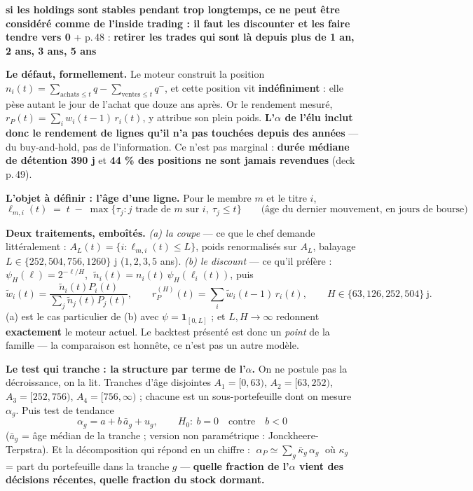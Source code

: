 \documentclass[11pt,a4paper]{article}
\newcommand{\remarque}[1]{{\color{rouge}\textbf{\og{} #1 \fg{}}}}
\begin{document}
\remarque{si les holdings sont stables pendant trop longtemps, ce ne peut être considéré comme de l'inside trading : il faut les discounter et les faire tendre vers 0}
\;+\; p.\,48 : \remarque{retirer les trades qui sont là depuis plus de 1 an, 2 ans, 3 ans, 5 ans}

\textbf{Le défaut, formellement.} Le moteur construit la position
$n_i(t)=\sum_{\text{achats}\le t} q-\sum_{\text{ventes}\le t} q^{-}$,
et cette position vit \textbf{indéfiniment} : elle pèse autant le jour de l'achat que douze ans après.
Or le rendement mesuré, $r_P(t)=\sum_i w_i(t{-}1)\,r_i(t)$, y attribue son plein poids.
\textbf{L'$\alpha$ de l'élu inclut donc le rendement de lignes qu'il n'a pas touchées depuis des années} --- du buy-and-hold, pas de l'information.
Ce n'est pas marginal : \textbf{durée médiane de détention 390 j} et \textbf{44 \% des positions ne sont jamais revendues} (deck p.\,49).

\textbf{L'objet à définir : l'âge d'une ligne.} Pour le membre $m$ et le titre $i$,
\[
\ell_{m,i}(t) \;=\; t \;-\; \max\{\tau_j : j \text{ trade de } m \text{ sur } i,\ \tau_j \le t\}
\qquad\text{(âge du dernier mouvement, en jours de bourse)}
\]

\textbf{Deux traitements, emboîtés.} \emph{(a) la coupe} --- ce que le chef demande littéralement :
$A_L(t)=\{i:\ell_{m,i}(t)\le L\}$, poids renormalisés sur $A_L$, balayage $L\in\{252,504,756,1260\}$ j ($1,2,3,5$ ans).
\emph{(b) le discount} --- ce qu'il préfère : $\psi_H(\ell)=2^{-\ell/H}$, $\;\tilde n_i(t)=n_i(t)\,\psi_H(\ell_i(t))$, puis
\[
\tilde w_i(t)=\frac{\tilde n_i(t)P_i(t)}{\sum_j \tilde n_j(t)P_j(t)},
\qquad
r_P^{(H)}(t)=\sum_i \tilde w_i(t{-}1)\,r_i(t),
\qquad H\in\{63,126,252,504\}\ \text{j}.
\]
{\small (a) est le cas particulier de (b) avec $\psi=\mathbf 1_{[0,L]}$ ; et $L,H\to\infty$ redonnent \textbf{exactement} le moteur actuel. Le backtest présenté est donc un \emph{point} de la famille --- la comparaison est honnête, ce n'est pas un autre modèle.}

\textbf{Le test qui tranche : la structure par terme de l'$\alpha$.} On ne postule pas la décroissance, on la lit.
Tranches d'âge disjointes $A_1=[0,63)$, $A_2=[63,252)$, $A_3=[252,756)$, $A_4=[756,\infty)$ ; chacune est un sous-portefeuille dont on mesure $\alpha_g$. Puis test de tendance
\[
\alpha_g = a + b\,\bar a_g + u_g,
\qquad H_0:\ b=0 \quad\text{contre}\quad b<0
\]
($\bar a_g$ = âge médian de la tranche ; version non paramétrique : Jonckheere-Terpstra).
Et la décomposition qui répond en un chiffre : $\;\alpha_P \simeq \sum_g \bar\kappa_g\,\alpha_g\;$ où $\kappa_g$ = part du portefeuille dans la tranche $g$ --- \textbf{quelle fraction de l'$\alpha$ vient des décisions récentes, quelle fraction du stock dormant.}
\end{document}
